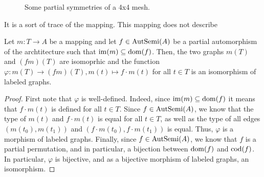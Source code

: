 \begin{figure}[h]
	\centering
   \resizebox{0.55\textwidth}{!}{}
	\caption{Some partial symmetries of a 4x4 mesh.}
	\label{fig:partial_symmetries_4x4}
\end{figure}
It is a sort of trace of the mapping. This mapping does not describe 

\begin{lem}
\label{lem:symmetry_to_iso}
Let $m : T \rightarrow A$ be a mapping and let $f \in \operatorname{AutSemi}(A)$ be a partial automorphism of the archtitecture such that $\operatorname{im}(m) \subseteq \operatorname{dom}(f)$. Then, the two graphs $m(T)$ and $(fm)(T)$ are isomoprhic and the function $\varphi: m(T) \rightarrow (fm)(T), m(t) \mapsto f \cdot m(t)$ for all $t \in T$ is an isomorphism of labeled graphs.
\begin{proof}
First note that $\varphi$ is well-defined. Indeed, since $\operatorname{im}(m) \subseteq \operatorname{dom}(f)$ it means that $f \cdot m(t)$ is defined for all $t \in T$. Since $f \in \operatorname{AutSemi}(A)$, we know that the type of $m(t)$ and $f \cdot m(t)$ is equal for all $t \in T$, as well as the type of all edges $(m(t_0),m(t_1))$ and  $(f \cdot m(t_0), f \cdot m(t_1))$ is equal. Thus, $\varphi$ is a morphism of labeled graphs. Finally, since $f \in \operatorname{AutSemi}(A)$, we know that $f$ is a partial permutation, and in particular, a bijection between $\operatorname{dom}(f)$ and $\operatorname{cod}(f)$. In particular, $\varphi$ is bijective, and as a bijective morphism of labeled graphs, an isomorphism. 
\end{proof}
\end{lem}

